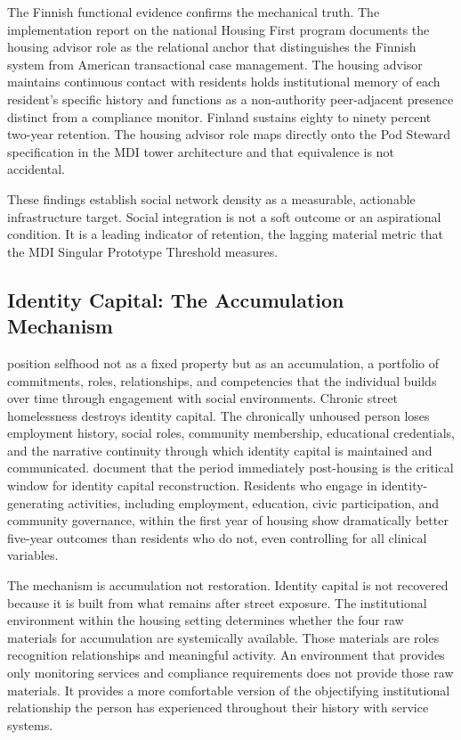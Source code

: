 \documentclass[12pt, letterpaper]{article}
\begin{document}
The Finnish functional evidence confirms the mechanical truth. The \citet{yfoundation_2022} implementation report on the national Housing First program documents the housing advisor role as the relational anchor that distinguishes the Finnish system from American transactional case management. The housing advisor maintains continuous contact with residents holds institutional memory of each resident's specific history and functions as a non-authority peer-adjacent presence distinct from a compliance monitor. Finland sustains eighty to ninety percent two-year retention. The housing advisor role maps directly onto the Pod Steward specification in the MDI tower architecture and that equivalence is not accidental.

These findings establish social network density as a measurable, actionable infrastructure target. Social integration is not a soft outcome or an aspirational condition. It is a leading indicator of retention, the lagging material metric that the MDI Singular Prototype Threshold measures.

\subsection{Identity Capital: The Accumulation Mechanism}

\citet{cote_levine_2002} position selfhood not as a fixed property but as an accumulation, a portfolio of commitments, roles, relationships, and competencies that the individual builds over time through engagement with social environments. Chronic street homelessness destroys identity capital. The chronically unhoused person loses employment history, social roles, community membership, educational credentials, and the narrative continuity through which identity capital is maintained and communicated. \citet{klodnick_samuels_2020} document that the period immediately post-housing is the critical window for identity capital reconstruction. Residents who engage in identity-generating activities, including employment, education, civic participation, and community governance, within the first year of housing show dramatically better five-year outcomes than residents who do not, even controlling for all clinical variables.

The mechanism is accumulation not restoration. Identity capital is not recovered because it is built from what remains after street exposure. The institutional environment within the housing setting determines whether the four raw materials for accumulation are systemically available. Those materials are roles recognition relationships and meaningful activity. An environment that provides only monitoring services and compliance requirements does not provide those raw materials. It provides a more comfortable version of the objectifying institutional relationship the person has experienced throughout their history with service systems.
\end{document}
